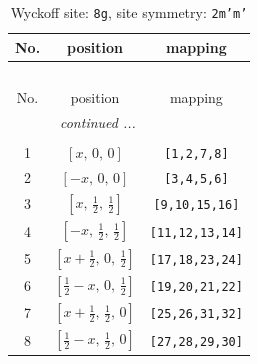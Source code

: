 \documentclass[fleqn,8pt]{jsarticle}
\begin{document}
\begin{longtable}{ccc}
\caption{Wyckoff site: {\tt 8g}, site symmetry: {\tt 2m'm'}}
 \\
 \hline \hline
No. & position & mapping \\ \hline \endfirsthead

\multicolumn{2}{l}{\tablename\ \thetable{}} \\
 \hline \hline
No. & position & mapping \\ \hline \endhead

 \hline \hline
\multicolumn{2}{r}{\footnotesize\it continued ...} \\ \endfoot

 \hline \hline
\multicolumn{2}{r}{} \\ \endlastfoot

1 & $\left[ x,\, 0,\, 0 \right]$ & {\tt [1,2,7,8]} \\ \hline
2 & $\left[ - x,\, 0,\, 0 \right]$ & {\tt [3,4,5,6]} \\ \hline
3 & $\left[ x,\, \frac{1}{2},\, \frac{1}{2} \right]$ & {\tt [9,10,15,16]} \\ \hline
4 & $\left[ - x,\, \frac{1}{2},\, \frac{1}{2} \right]$ & {\tt [11,12,13,14]} \\ \hline
5 & $\left[ x + \frac{1}{2},\, 0,\, \frac{1}{2} \right]$ & {\tt [17,18,23,24]} \\ \hline
6 & $\left[ \frac{1}{2} - x,\, 0,\, \frac{1}{2} \right]$ & {\tt [19,20,21,22]} \\ \hline
7 & $\left[ x + \frac{1}{2},\, \frac{1}{2},\, 0 \right]$ & {\tt [25,26,31,32]} \\ \hline
8 & $\left[ \frac{1}{2} - x,\, \frac{1}{2},\, 0 \right]$ & {\tt [27,28,29,30]} \\
\end{longtable}
\renewcommand{\arraystretch}{1.2}
\end{document}
